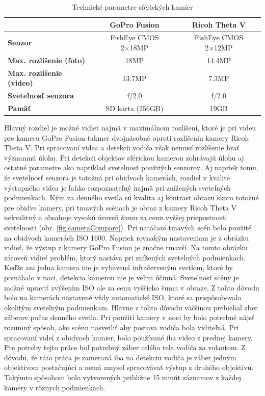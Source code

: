 \documentclass[slovak,master,dept460,male,cpp,cpdeclaration]{diploma}
\begin{document}
\begin{table}[H]
\begin{tabular}{|l|c|c|}
\hline
                                     & \textbf{GoPro Fusion}  & \textbf{Ricoh Theta V} \\ \hline
\textbf{Senzor}                      & FishEye CMOS 2×18MP    & FishEye CMOS 2×12MP    \\ \hline
\textbf{Max. rozlíšenie (foto)}      & 18MP                   & 14.4MP                 \\ \hline
\textbf{Max. rozlíšenie (video)}     & 13.7MP                 & 7.3MP                  \\ \hline
\textbf{Svetelnosť senzora}          &  f/2.0                 & f/2.0                  \\ \hline
\textbf{Pamäť}                       &  SD karta (256GB)      & 19GB                   \\ \hline
\end{tabular}
	\caption{Technické parametre sférických kamier}
	\label{tab:techSpec}
\end{table}
\newpage
 Hlavný rozdiel je možné vidieť najmä v maximálnom rozlíšení, ktoré je pri videu pre kameru GoPro Fusion takmer dvojnásobné oproti rozlíšeniu kamery Ricoh Theta V. Pri spracovaní videa a detekcii vodiča však nemusí rozlíšenie hrať významnú úlohu. Pri detekcii objektov sférickou kamerou zohrávajú úlohu aj ostatné parametre ako napríklad svetelnosť použitých senzorov. Aj napriek tomu, že svetelnosť senzora je totožná pri obidvoch kamerách, rozdiel v kvalite výstupného videa je ľahko rozpoznateľný najmä pri znížených svetelných podmienkach. Kým za denného svetla sú kvalita aj kontrast obrazu skoro totožné pre obidve kamery, pri tmavých scénach je obraz z kamery Ricoh Theta V nekvalitný a obsahuje vysokú úroveň šumu za cenu vyššej priepustnosti svetelnosti (obr. \ref{fig:cameraCompare}). Pri natáčaní tmavých scén bolo použité na obidvoch kamerách ISO 1600. Napriek rovnakým nastaveniam je z obrázku vidieť, že výstup z kamery GoPro Fusion je značne tmavší. Na tomto obrázku zároveň vidieť problém, ktorý nastáva  pri znížených svetelných podmienkach. Keďže ani jedna kamera nie je vybavená infračerveným svetlom, ktoré by pomáhalo v noci, detekcia kamerou  nie je veľmi účinná. Svetelnosť scény je možné upraviť zvýšením ISO ale za cenu vyššieho šumu v obraze. Z tohto dôvodu bolo na kamerách nastavené vždy automatické ISO, ktoré sa prispôsobovalo okolitým svetelným podmienkam. Hlavne z tohto dôvodu väčšinou prebiehal zber záberov počas denného svetla. Pri  použití kamery v noci by bolo potrebné nájsť rozumný spôsob, ako scénu nasvetliť aby postava vodiča bola viditeľná. Pri spracovaní videí z obidvoch kamier, bolo používané iba video z prednej kamery. Pre potreby tejto práce bol potrebný záber celého tela vodiča za volantom. Z dôvodu, že táto práca je zameraná iba na detekciu vodiča je záber jedným objektívom postačujúci a nemá zmysel spracovávať výstup z druhého objektívu. Takýmto spôsobom bolo vytvorených približne 15 minút záznamov z každej kamery v rôznych podmienkach.
\end{document}

